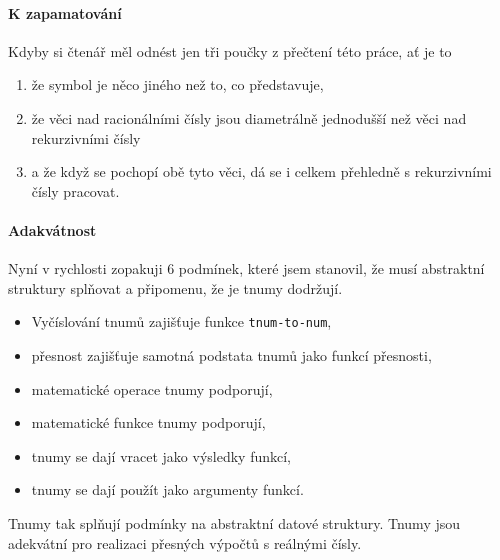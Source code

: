 \paragraph{K zapamatování} Kdyby si čtenář měl odnést jen tři poučky z přečtení této práce, ať je to
\begin{enumerate}
\item{že symbol je něco jiného než to, co představuje,}
\item{že věci nad racionálními čísly jsou diametrálně jednodušší než věci nad rekurzivními čísly}
\item{a že když se pochopí obě tyto věci, dá se i celkem přehledně s rekurzivními čísly pracovat.}
\end{enumerate}

\paragraph{Adakvátnost} Nyní v rychlosti zopakuji 6 podmínek, které jsem stanovil, že musí abstraktní struktury splňovat a připomenu, že je tnumy dodržují.
\begin{itemize}
\item{Vyčíslování tnumů zajišťuje funkce \texttt{tnum-to-num},}
\item{přesnost zajišťuje samotná podstata tnumů jako funkcí přesnosti,}
\item{matematické operace tnumy podporují,}
\item{matematické funkce tnumy podporují,}
\item{tnumy se dají vracet jako výsledky funkcí,}
\item{tnumy se dají použít jako argumenty funkcí.}
\end{itemize}
Tnumy tak splňují podmínky na abstraktní datové struktury. Tnumy jsou adekvátní pro realizaci přesných výpočtů s reálnými čísly.